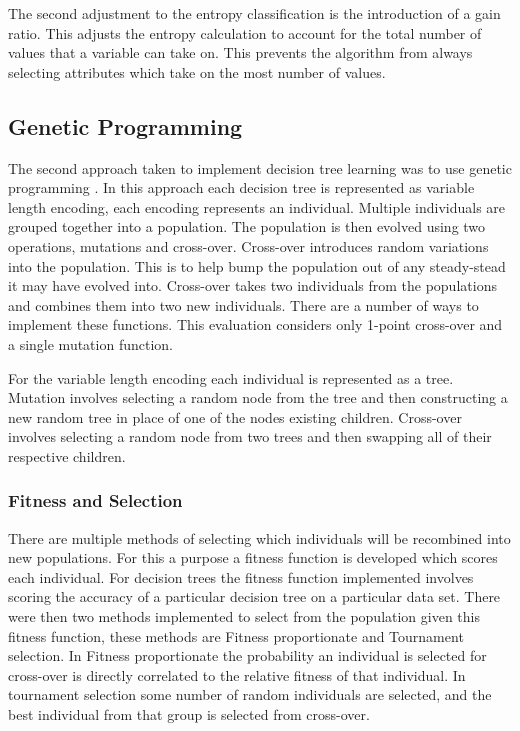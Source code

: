 \documentclass[12pt,letterpaper]{article}
\begin{document}
The second adjustment to the entropy classification is the introduction of a gain ratio. This adjusts the entropy calculation to account for the total number of values that a variable can take on. This prevents the algorithm from always selecting attributes which take on the most number of values. 

\subsection{Genetic Programming}

The second approach taken to implement decision tree learning was to use genetic programming \cite{gentut}. In this approach each decision tree is represented as variable length encoding, each encoding represents an individual. Multiple individuals are grouped together into a population. The population is then evolved using two operations, mutations and cross-over. Cross-over introduces random variations into the population. This is to help bump the population out of any steady-stead it may have evolved into. Cross-over takes two individuals from the populations and combines them into two new individuals. There are a number of ways to implement these functions. This evaluation considers only 1-point cross-over and a single mutation function. 

For the variable length encoding each individual is represented as a tree. Mutation involves selecting a random node from the tree and then constructing a new random tree in place of one of the nodes existing children. Cross-over involves selecting a random node from two trees and then swapping all of their respective children. 

\subsubsection*{Fitness and Selection}

There are multiple methods of selecting which individuals will be recombined into new populations. For this a purpose a fitness function is developed which scores each individual. For decision trees the fitness function implemented involves scoring the accuracy of a particular decision tree on a particular data set. There were then two methods implemented to select from the population given this fitness function, these methods are Fitness proportionate and Tournament selection. In Fitness proportionate the probability an individual is selected for cross-over is directly correlated to the relative fitness of that individual. In tournament selection some number of random individuals are selected, and the best individual from that group is selected from cross-over. 
\end{document}
